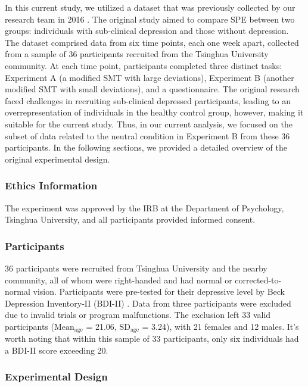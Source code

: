 \documentclass[sn-apa]{sn-jnl}%
\theoremstyle{thmstyleone}%
\theoremstyle{thmstyletwo}%
\theoremstyle{thmstylethree}%
\begin{document}
In this current study, we utilized a dataset that was previously collected by our research team in 2016 \parencite{hu2023data}. The original study aimed to compare SPE between two groups: individuals with sub-clinical depression and those without depression. The dataset comprised data from six time points, each one week apart, collected from a sample of 36 participants recruited from the Tsinghua University community. At each time point, participants completed three distinct tasks: Experiment A (a modified SMT with large deviations), Experiment B (another modified SMT with small deviations), and a questionnaire. The original research faced challenges in recruiting sub-clinical depressed participants, leading to an overrepresentation of individuals in the healthy control group, however, making it suitable for the current study. Thus, in our current analysis, we focused on the subset of data related to the neutral condition in Experiment B from these 36 participants. In the following sections, we provided a detailed overview of the original experimental design. 

\subsubsection{Ethics Information}\label{subsec:ethics}

The experiment was approved by the IRB at the Department of Psychology, Tsinghua University, and all participants provided informed consent.

\subsubsection{Participants}\label{subsec:participants}

36 participants were recruited from Tsinghua University and the nearby community, all of whom were right-handed and had normal or corrected-to-normal vision. Participants were pre-tested for their depressive level by Beck Depression Inventory-II (BDI-II) \parencite{wang2011reliability}. Data from three participants were excluded due to invalid trials or program malfunctions. The exclusion left 33 valid participants ($\text{Mean}_{\text{age}}$ = 21.06, $\text{SD}_{\text{age}}$ = 3.24), with 21 females and 12 males. It's worth noting that within this sample of 33 participants, only six individuals had a BDI-II score exceeding 20.

\subsubsection{Experimental Design}\label{subsec:experimentaldesign}
\end{document}
